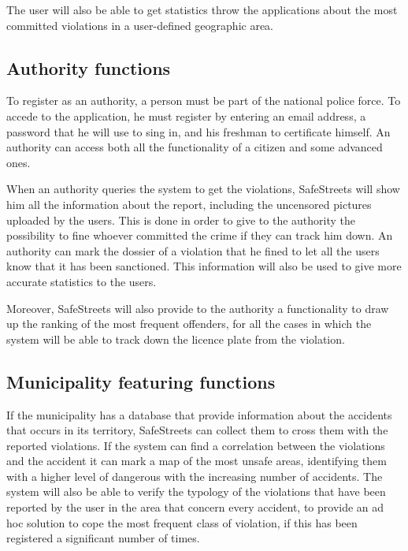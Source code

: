 \documentclass[../RASD.tex]{subfiles}
\begin{document}
    The user will also be able to get statistics throw the applications about the most committed violations in a user-defined geographic area.
    \subsection{Authority functions}\label{subsec:authority-functions}
    To register as an authority, a person must be part of the national police force. To accede to the application, he must register by entering an email address, a password that he will use to sing in, and his freshman to certificate himself. An authority can access both all the functionality of a citizen and some advanced ones.

    When an authority queries the system to get the violations, SafeStreets will show him all the information about the report, including the uncensored pictures uploaded by the users. This is done in order to give to the authority the possibility to fine whoever committed the crime if they can track him down. An authority can mark the dossier of a violation that he fined to let all the users know that it has been sanctioned. This information will also be used to give more accurate statistics to the users.

    Moreover, SafeStreets will also provide to the authority a functionality to draw up the ranking of the most frequent offenders, for all the cases in which the system will be able to track down the licence plate from the violation.
    \subsection{Municipality featuring functions}\label{subsec:municipality-featuring-functions}
    If the municipality has a database that provide information about the accidents that occurs in its territory, SafeStreets can collect them to cross them with the reported violations. If the system can find a correlation between the violations and the accident it can mark a map of the most unsafe areas, identifying them with a higher level of dangerous with the increasing number of accidents. The system will also be able to verify the typology of the violations that have been reported by the user in the area that concern every accident, to provide an ad hoc solution to cope the most frequent class of violation, if this has been registered a significant number of times.
\end{document}
